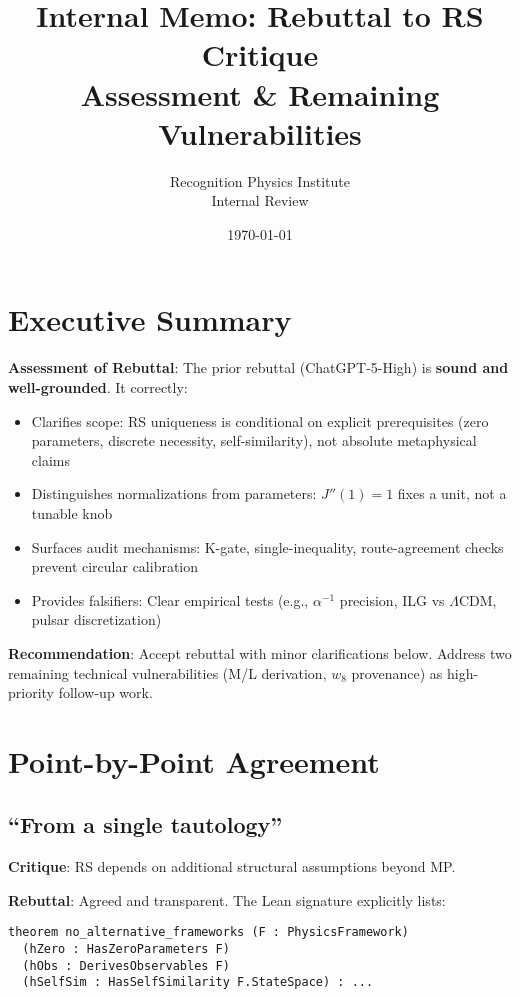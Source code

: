 \documentclass[11pt]{article}
\title{\textbf{Internal Memo: Rebuttal to RS Critique}\\
\large Assessment \& Remaining Vulnerabilities}
\author{Recognition Physics Institute\\Internal Review}
\date{\today}
\begin{document}
\maketitle

\section*{Executive Summary}

\noindent\textbf{Assessment of Rebuttal}: The prior rebuttal (ChatGPT-5-High) is \textbf{sound and well-grounded}. It correctly:
\begin{itemize}
\item Clarifies scope: RS uniqueness is conditional on explicit prerequisites (zero parameters, discrete necessity, self-similarity), not absolute metaphysical claims
\item Distinguishes normalizations from parameters: $J''(1)=1$ fixes a unit, not a tunable knob
\item Surfaces audit mechanisms: K-gate, single-inequality, route-agreement checks prevent circular calibration
\item Provides falsifiers: Clear empirical tests (e.g., $\alpha^{-1}$ precision, ILG vs $\Lambda$CDM, pulsar discretization)
\end{itemize}

\noindent\textbf{Recommendation}: Accept rebuttal with minor clarifications below. Address two remaining technical vulnerabilities (M/L derivation, $w_8$ provenance) as high-priority follow-up work.

\section{Point-by-Point Agreement}

\subsection{``From a single tautology''}

\textbf{Critique}: RS depends on additional structural assumptions beyond MP.

\textbf{Rebuttal}: Agreed and transparent. The Lean signature explicitly lists:
\begin{verbatim}
theorem no_alternative_frameworks (F : PhysicsFramework)
  (hZero : HasZeroParameters F)
  (hObs : DerivesObservables F)
  (hSelfSim : HasSelfSimilarity F.StateSpace) : ...
\end{verbatim}
\end{document}

